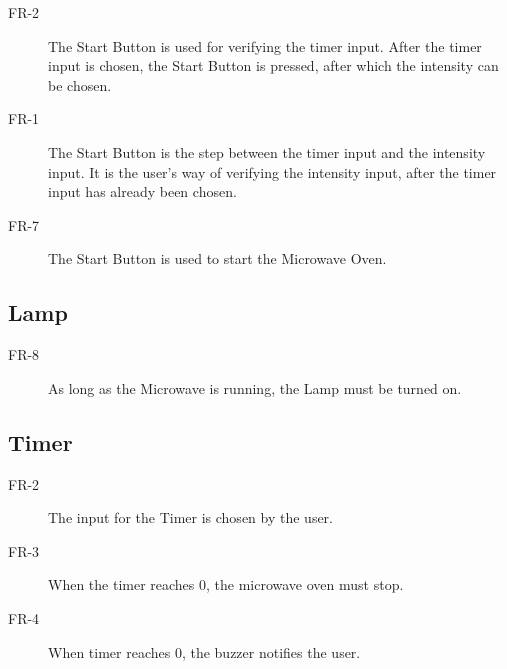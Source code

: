 \begin{description}
	\item[FR-2] The Start Button is used for verifying the timer input. After the timer input is chosen, the Start Button is pressed, after which the intensity can be chosen. 
	\item[FR-1] The Start Button is the step between the timer input and the intensity input. It is the user's way of verifying the intensity input, after the timer input has already been chosen.  
	\item[FR-7] The Start Button is used to start the Microwave Oven.
\end{description}
\subsection*{Lamp}
	\begin{description}
		\item[FR-8] As long as the Microwave is running, the Lamp must be turned on. 
	\end{description}
\subsection*{Timer}
	\begin{description}
			\item[FR-2] The input for the Timer is chosen by the user.
			\item[FR-3] When the timer reaches 0, the microwave oven must stop.
			\item[FR-4] When timer reaches 0, the buzzer notifies the user.
	\end{description}